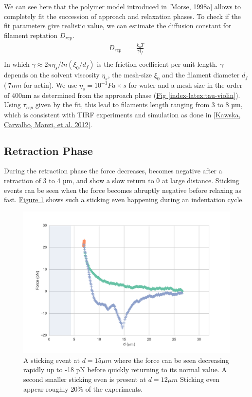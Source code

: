 \documentclass[A4paperpaper,11pt,english]{sphinxmanual}
\begin{document}
We can see here that the polymer model introduced in {\hyperref[index-latex:morse1998a]{{[}Morse,  1998a{]}}} allows
to completely fit the succession of approach and relaxation phases.  To check if
the fit parameters give realistic value, we can estimate the diffusion constant
for filament reptation \(D_{rep}\).
\label{index-latex:equation-eqa3-10}\begin{gather}
\begin{split}D_{rep} &= \frac{k_bT}{\gamma l_f} \\\end{split}\label{index-latex-eqa3-10}
\end{gather}
In which \(\gamma\approx {2\pi\eta_s}/{ln(\xi_0/d_f)}\) is the friction
coefficient per unit length. \(\gamma\) depends on the solvent viscosity
\(\eta_s\), the mesh-size \(\xi_0\) and the filament diameter
\(d_f\) (\(~7nm\) for actin).  We use \(\eta_s=10^{-3} Pa\times s\)
for water and a mesh size in the order of 400nm as determined from the approach phase
(\hyperref[index-latex:tau-violin]{Fig  \ref*{index-latex:tau-violin}}). Using \(\tau_{rep}\) given by the fit, this lead to filaments
length ranging from 3 to 8 µm, which is consistent with TIRF experiments and simulation as done in {\hyperref[index-latex:kawska2012]{{[}Kawska, Carvalho, Manzi,  et al.  2012{]}}}.


\subsection{Retraction Phase}
\label{index-latex:retraction-phase}
During the retraction phase the force decreases, becomes negative after a
retraction of 3 to 4 µm, and show a slow  return to 0 at large distance.
Sticking events can be seen when the force becomes abruptly negative before
relaxing as fast. \hyperref[index-latex:sticking-event]{Figure  \ref*{index-latex:sticking-event}} shows such a sticking even
happening during an indentation cycle.
\begin{figure}[htbp]
\centering
\capstart

\includegraphics[width=0.800\linewidth]{sticking-event.png}
\caption{A sticking event at \(d=15\mu{}m\) where the force can be seen decreasing rapidly
up to -18 pN before quickly returning to its normal value. A second smaller
sticking even is present at \(d=12\mu{}m\) Sticking even appear roughly 20\% of
the experiments.}\label{index-latex:sticking-event}\end{figure}
\end{document}
